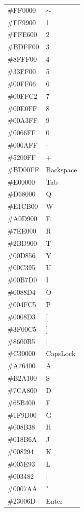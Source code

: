 \documentclass{report}
\begin{document}
\begin{supertabular}{ll}
	\#FF0000 & $\sim$            \\
	\#FF9900 & 1                 \\
	\#FFE600 & 2                 \\
	\#BDFF00 & 3                 \\
	\#8FFF00 & 4                 \\
	\#33FF00 & 5                 \\
	\#00FF66 & 6                 \\
	\#00FFC2 & 7                 \\
	\#00E0FF & 8                 \\
	\#00A3FF & 9                 \\
	\#0066FF & 0                 \\
	\#000AFF & -                 \\
	\#5200FF & +                 \\
	\#BD00FF & Backspace         \\

	\#E00000 & Tab               \\
	\#D68000 & Q								 \\
	\#E1CB00 & W								 \\
	\#A0D900 & E								 \\
	\#7EE000 & R								 \\
	\#2BD900 & T								 \\
	\#00D856 & Y								 \\
	\#00C395 & U								 \\
	\#00B7D0 & I								 \\
	\#0088D4 & O								 \\
	\#004FC5 & P								 \\
	\#0008D3 & [								 \\
			\#3F00C5 & ]								 \\
	\#8600B5 & $\vert$					 \\

	\#C30000 & CapsLock          \\
	\#A76400 & A								 \\
	\#B2A100 & S								 \\
	\#7CA800 & D								 \\
	\#65B400 & F								 \\
	\#1F9D00 & G								 \\
	\#008B38 & H								 \\
	\#018B6A & J								 \\
	\#008294 & K								 \\
	\#005E93 & L								 \\
	\#003482 & :								 \\
	\#0007AA & "								 \\
	\#23006D & Enter						 \\


\end{supertabular}
\end{document}
